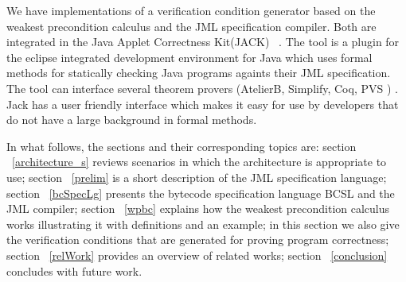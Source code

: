 We have implementations of a verification condition generator based on the weakest precondition calculus and the JML 
specification compiler. Both are integrated in the Java Applet Correctness Kit(JACK) ~\cite{BRL-JACK}. The tool is a plugin 
for the eclipse  integrated development environment for Java which uses formal methods for
statically checking Java programs againts their JML specification. The tool can interface several theorem provers (AtelierB, 
Simplify, Coq, PVS ) . Jack has a user friendly interface which makes it easy for use by developers that do not have
a large background in formal methods.

In what follows, the sections and their corresponding topics are: 
section ~\ref{architecture_s} reviews scenarios in which the architecture is appropriate to use; section  ~\ref{prelim} is a short description of the JML specification language; section ~\ref{bcSpecLg} presents the bytecode 
specification language BCSL and the JML compiler; section ~\ref{wpbc} explains how the weakest precondition calculus 
works illustrating it with definitions and an example; in this section we also give the verification conditions that are generated for 
proving program correctness; section ~\ref{relWork} provides an overview of related works; section ~\ref{conclusion} concludes with future work.  















